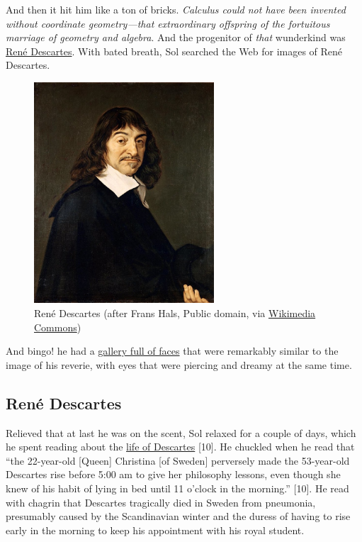 \documentclass[
  11pt,
  british,
  a4paper,
]{article}
\makeatletter
\newcounter{figno}
\newenvironment{fignos:no-prefix-figure-caption}{
      \caption@ifcompatibility{}{
        \let\oldthefigure\thefigure
        \let\oldtheHfigure\theHfigure
        \renewcommand{\thefigure}{figno:\thefigno}
        \renewcommand{\theHfigure}{figno:\thefigno}
        \stepcounter{figno}
        \captionsetup{labelformat=empty}
      }
    }{
      \caption@ifcompatibility{}{
        \captionsetup{labelformat=default}
        \let\thefigure\oldthefigure
        \let\theHfigure\oldtheHfigure
        \addtocounter{figure}{-1}
      }
    }
\makeatother
\begin{document}
And then it hit him like a ton of bricks. \emph{Calculus could not have
been invented without coordinate geometry---that extraordinary offspring
of the fortuitous marriage of geometry and algebra}. And the progenitor
of \emph{that} wunderkind was
\href{https://en.wikipedia.org/wiki/Ren\%C3\%A9_Descartes}{René
Descartes}. With bated breath, Sol searched the Web for images of René
Descartes.

\begin{fignos:no-prefix-figure-caption}

\begin{figure}
\centering
\includegraphics[width=0.6\textwidth,height=\textheight]{images/rene-descartes.jpg}
\caption{René Descartes (after Frans Hals, Public domain, via
\href{https://commons.wikimedia.org/wiki/File:Frans_Hals_-_Portret_van_Ren\%C3\%A9_Descartes.jpg}{Wikimedia
Commons})}
\end{figure}

\end{fignos:no-prefix-figure-caption}

And bingo! he had a \href{https://tinyurl.com/y57nykjd}{gallery full of
faces} that were remarkably similar to the image of his reverie, with
eyes that were piercing and dreamy at the same time.

\hypertarget{renuxe9-descartes}{%
\subsection{René Descartes}\label{renuxe9-descartes}}

Relieved that at last he was on the scent, Sol relaxed for a couple of
days, which he spent reading about the
\href{https://www.britannica.com/biography/Rene-Descartes}{life of
Descartes} {[}10{]}. He chuckled when he read that ``the 22-year-old
{[}Queen{]} Christina {[}of Sweden{]} perversely made the 53-year-old
Descartes rise before 5:00 am to give her philosophy lessons, even
though she knew of his habit of lying in bed until 11 o'clock in the
morning.'' {[}10{]}. He read with chagrin that Descartes tragically died
in Sweden from pneumonia, presumably caused by the Scandinavian winter
and the duress of having to rise early in the morning to keep his
appointment with his royal student.
\end{document}
